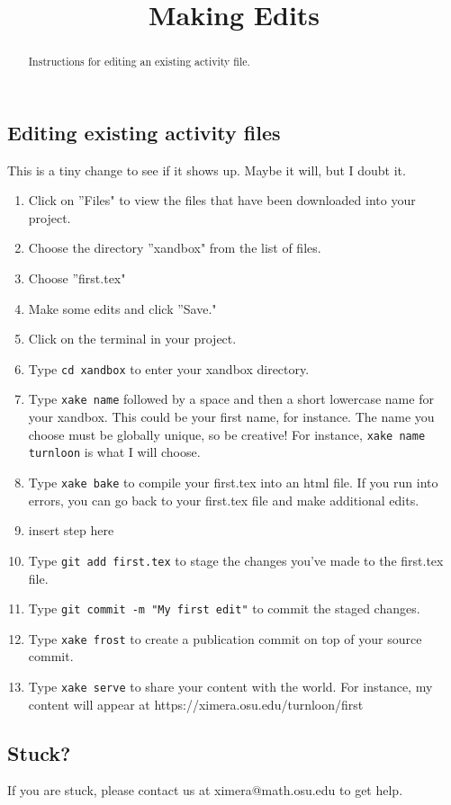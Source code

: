 \documentclass{ximera}
\title{Making Edits}
\begin{document}
\begin{abstract}
Instructions for editing an existing activity file.
\end{abstract}
\maketitle


\subsection{Editing existing activity files}
This is a tiny change to see if it shows up. Maybe it will, but I doubt it.
\begin{enumerate}

\item Click on ''Files" to view the files that have been downloaded into your project.
\item Choose the directory ''xandbox" from the list of files.
\item Choose ''first.tex"
\item Make some edits and click ''Save."
\item Click on the terminal in your project.
\item Type \verb!cd xandbox! to enter your xandbox directory.
\item Type \verb!xake name! followed by a space and then a short lowercase name for your xandbox.  This could be your first name, for instance.  The name you choose must be globally unique, so be creative!  For instance, \verb!xake name turnloon! is what I will choose.
\item Type \verb!xake bake! to compile your first.tex into an html file.  If you run into errors, you can go back to your first.tex file and make additional edits.
\item insert step here
\item Type \verb!git add first.tex! to stage the changes you've made to the first.tex file.
\item Type \verb!git commit -m "My first edit"! to commit the staged changes.
\item Type \verb!xake frost! to create a publication commit on top of your source commit.
\item Type \verb!xake serve! to share your content with the world.  For instance, my content will appear at https://ximera.osu.edu/turnloon/first
\end{enumerate}
\subsection{Stuck?}

If you are stuck, please contact us at ximera@math.osu.edu to get help.
\end{document}
